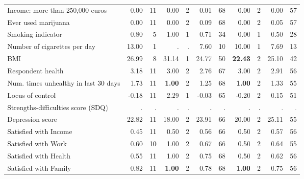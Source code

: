 \begin{tabular}{l r r r r r r r r r r}
Income: more than 250,000 euros &      0.00 &        11 &      0.00 &         2 &      0.01 &        68 &      0.00 &         2 &      0.00 &        57 \\
Ever used marijuana &      0.00 &        11 &      0.00 &         2 &      0.09 &        68 &      0.00 &         2 &      0.05 &        57 \\
Smoking indicator &      0.80 &         5 &      1.00 &         1 &      0.71 &        34 &      0.00 &         1 &      0.50 &        28 \\
Number of cigarettes per day &     13.00 &         1 &         . & . &      7.60 &        10 &     10.00 &         1 &      7.69 &        13 \\
BMI &     26.99 &         8 &     31.14 &         1 &     24.77 &        50 & \textbf{    22.43} &         2 &     25.10 &        42 \\
Respondent health &      3.18 &        11 &      3.00 &         2 &      2.76 &        67 &      3.00 &         2 &      2.91 &        56 \\
Num. times unhealthy in last 30 days &      1.73 &        11 & \textbf{     1.00} &         2 &      1.25 &        68 & \textbf{     1.00} &         2 &      1.33 &        55 \\
Locus of control &     -0.18 &        11 &      2.29 &         1 &     -0.03 &        65 &     -0.20 &         2 &      0.15 &        51 \\
Strengths-difficulties score (SDQ) &         . & . &         . & . &         . & . &         . & . &         . & . \\
Depression score &     22.82 &        11 &     18.00 &         2 &     23.91 &        66 &     20.00 &         2 &     25.11 &        55 \\
Satisfied with Income &      0.45 &        11 &      0.50 &         2 &      0.56 &        66 &      0.50 &         2 &      0.57 &        56 \\
Satisfied with Work &      0.60 &        10 &      1.00 &         2 &      0.67 &        66 &      0.50 &         2 &      0.64 &        55 \\
Satisfied with Health &      0.55 &        11 &      1.00 &         2 &      0.75 &        68 &      0.50 &         2 &      0.62 &        56 \\
Satisfied with Family &      0.82 &        11 & \textbf{     1.00} &         2 &      0.78 &        68 & \textbf{     1.00} &         2 &      0.75 &        56 \\
\bottomrule
\end{tabular}
